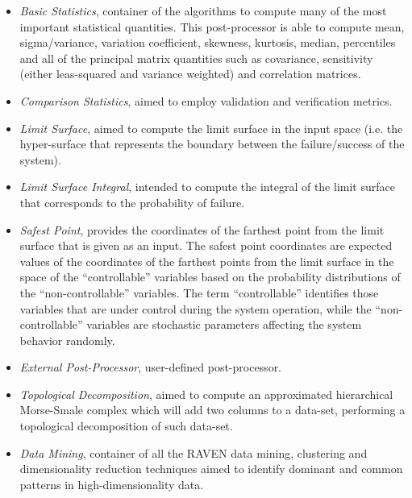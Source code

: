 \begin{itemize}
 \item \textit{Basic Statistics}, container of the algorithms to compute many of the most important statistical quantities. This post-processor is able to compute mean, sigma/variance, variation coefficient, skewness, kurtosis, median, percentiles and all of the principal matrix quantities such as covariance, sensitivity (either leas-squared and variance weighted) and correlation matrices.
 \item \textit{Comparison Statistics}, aimed to employ validation and verification metrics.
 \item \textit{Limit Surface}, aimed to compute the limit surface in the input space (i.e. the hyper-surface that represents the boundary between the failure/success of the system).
 \item \textit{Limit Surface Integral}, intended to compute the integral of the limit surface that corresponds to the probability of failure.
  \item \textit{Safest Point}, provides the coordinates of the farthest point from the limit surface that is given as an input. The safest point coordinates are expected values of the coordinates of the farthest points from the limit surface in the space of the ``controllable'' variables based on the probability distributions of the ``non-controllable'' variables. The term ``controllable'' identifies those variables that are under control during the system operation, while the ``non-controllable'' variables are stochastic parameters affecting the system behavior randomly.
 \item \textit{External Post-Processor}, user-defined post-processor.
 \item \textit{Topological Decomposition}, aimed to compute an approximated hierarchical Morse-Smale complex which will add two columns to a data-set, performing a topological decomposition of such data-set.
 \item \textit{Data Mining}, container of all the RAVEN data mining, clustering and dimensionality reduction techniques aimed to identify dominant and common patterns in high-dimensionality data.
\end{itemize}

